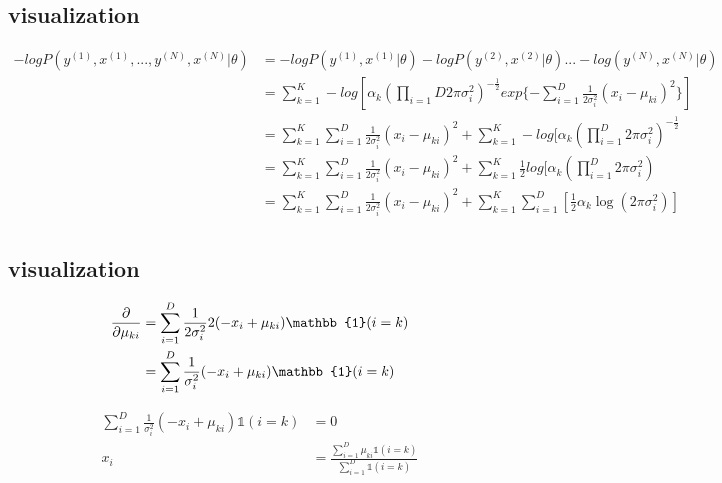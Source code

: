 \documentclass[letterpaper, 12]{article}
\begin{document}
\subsection{visualization}

\begin{equation*}
\begin{split}
-log P(y^{(1)}, x^{(1)}, ..., y^{(N)}, x^{(N)} | \theta) 
&=-log P(y^{(1)}, x^{(1)} | \theta) -log P(y^{(2)}, x^{(2)} | \theta) ... - log( y^{(N)}, x^{(N)} | \theta)\\
&= \sum_{k = 1}^{K} -log [\alpha_{k} (\prod_{i = 1}{D} 2 \pi \sigma_{i} ^2)^{ -\frac{1}{2}}
	 exp\{ - \sum_{i = 1}^{D} \frac{1}{2 \sigma_{i} ^2} (x_{i} - \mu_{ki})^2  \}] \\
&= \sum_{k = 1}^{K} \sum_{i = 1}^{D} \frac{1}{2 \sigma_{i} ^2}(x_{i} - \mu_{ki})^2 
	+ \sum_{k = 1}^{K} -log [\alpha_{k} (\prod_{i = 1}^{D} 2 \pi \sigma_{i} ^2)^{ -\frac{1}{2}}\\
&=  \sum_{k = 1}^{K} \sum_{i = 1}^{D} \frac{1}{2 \sigma_{i} ^2}(x_{i} - \mu_{ki})^2 
	+ \sum_{k = 1}^{K} \frac{1}{2} log [\alpha_{k} (\prod_{i = 1}^{D} 2 \pi \sigma_{i} ^2)\\
&= \sum_{k = 1}^{K} \sum_{i = 1}^{D} \frac{1}{2 \sigma_{i} ^2}(x_{i} - \mu_{ki})^2  +
	\sum_{k =1}^{K}  \sum_{i = 1}^{D}   [ \frac{1}{2} \alpha_{k} \log(2 \pi \sigma_{i} ^2) ]\\
\end{split}
\end{equation*}

\subsection{visualization}

\begin{equation*}
\begin{split}
\pdv{}{\mu_{ki}} &=  \sum_{i = 1}^{D} \frac{1}{2 \sigma_{i} ^2}
		2(- x_{i} + \mu_{ki})  \mathbb{1} ( i = k) \\
&= \sum_{i = 1}^{D} \frac{1}{\sigma_{i} ^2}
		(- x_{i} + \mu_{ki})  \mathbb{1} ( i = k) \\
\end{split}
\end{equation*}


\begin{equation*}
\begin{split}
\sum_{i = 1}^{D} \frac{1}{\sigma_{i} ^2}
		(- x_{i} + \mu_{ki})  \mathbb{1} ( i = k) &= 0 \\
 x_{i} &= \frac{\sum_{i = 1}^{D}\mu_{ki}{\mathbb{1} ( i = k)}}{\sum_{i = 1}^{D} {\mathbb{1} ( i = k)}}
\end{split}
\end{equation*}
\end{document}
